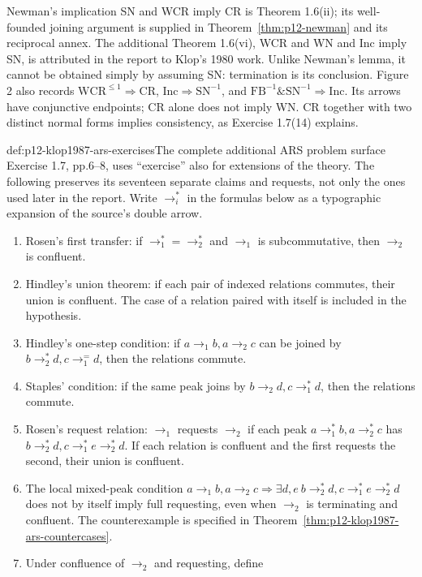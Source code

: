 Newman's implication SN and WCR imply CR is Theorem 1.6(ii); its
well-founded joining argument is supplied in
Theorem~\ref{thm:p12-newman} and its reciprocal annex. The additional
Theorem 1.6(vi), WCR and WN and Inc imply SN, is attributed in the report
to Klop's 1980 work. Unlike Newman's lemma, it cannot be obtained simply
by assuming SN: termination is its conclusion. Figure 2 also records
\(\mathrm{WCR}^{\leq1}\Rightarrow\mathrm{CR}\),
\(\mathrm{Inc}\Rightarrow\mathrm{SN}^{-1}\), and
\(\mathrm{FB}^{-1}\mathbin{\&}\mathrm{SN}^{-1}\Rightarrow\mathrm{Inc}\).
Its arrows have conjunctive endpoints; CR alone does not imply WN.
CR together with two distinct normal forms implies consistency, as
Exercise 1.7(14) explains.

\begin{hbdefinition}{def:p12-klop1987-ars-exercises}{The complete additional ARS problem surface}
Exercise 1.7, pp.6--8, uses ``exercise'' also for extensions of the theory.
The following preserves its seventeen separate claims and requests, not
only the ones used later in the report. Write \(\to_i^*\) in the
formulas below as a typographic expansion of the source's double arrow.
\begin{enumerate}
\item Rosen's first transfer: if \(\to_1^*=\to_2^*\) and
\(\to_1\) is subcommutative, then \(\to_2\) is confluent.
\item Hindley's union theorem: if each pair of indexed relations
commutes, their union is confluent. The case of a relation paired with
itself is included in the hypothesis.
\item Hindley's one-step condition: if
\(a\to_1 b,a\to_2 c\) can be joined by
\(b\to_2^*d,c\to_1^=d\), then the relations commute.
\item Staples' condition: if the same peak joins by
\(b\to_2d,c\to_1^*d\), then the relations commute.
\item Rosen's request relation: \(\to_1\) requests \(\to_2\) if
each peak \(a\to_1^*b,a\to_2^*c\) has
\(b\to_2^*d,c\to_1^*e\to_2^*d\). If each relation is confluent
and the first requests the second, their union is confluent.
\item The local mixed-peak condition
\(a\to_1b,a\to_2c\Rightarrow
\exists d,e\ b\to_2^*d,c\to_1^*e\to_2^*d\)
does not by itself imply full requesting, even when \(\to_2\)
is terminating and confluent. The counterexample is specified in
Theorem~\ref{thm:p12-klop1987-ars-countercases}.
\item Under confluence of \(\to_2\) and requesting, define

\end{enumerate}
\end{hbdefinition}
